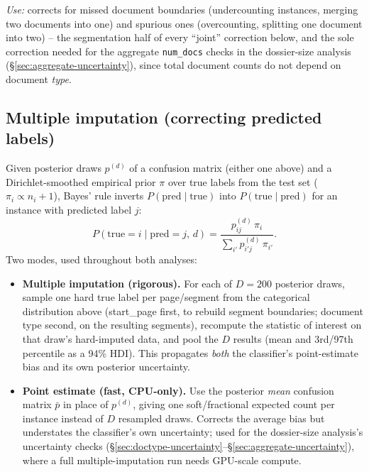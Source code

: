 \textit{Use:} corrects for missed document boundaries (undercounting
instances, merging two documents into one) and spurious ones (overcounting,
splitting one document into two) -- the segmentation half of every ``joint''
correction below, and the sole correction needed for the aggregate
\texttt{num\_docs} checks in the dossier-size analysis
(\S\ref{sec:aggregate-uncertainty}), since total document counts do not
depend on document \emph{type}.

\subsection{Multiple imputation (correcting predicted labels)}
\label{sec:mi}

Given posterior draws $p^{(d)}$ of a confusion matrix (either one above) and
a Dirichlet-smoothed empirical prior $\pi$ over true labels from the test
set ($\pi_i \propto n_i + 1$), Bayes' rule inverts $P(\text{pred}\mid\text{true})$
into $P(\text{true}\mid\text{pred})$ for an instance with predicted label $j$:
\begin{equation}
  P(\text{true}=i \mid \text{pred}=j,\, d) =
    \frac{p^{(d)}_{ij}\, \pi_i}{\sum_{i'} p^{(d)}_{i'j}\, \pi_{i'}}.
\end{equation}
Two modes, used throughout both analyses:
\begin{itemize}
  \item \textbf{Multiple imputation (rigorous).} For each of $D=200$
    posterior draws, sample one hard true label per page/segment from the
    categorical distribution above (start\_page first, to rebuild segment
    boundaries; document type second, on the resulting segments), recompute
    the statistic of interest on that draw's hard-imputed data, and pool the
    $D$ results (mean and 3rd/97th percentile as a 94\% HDI). This
    propagates \emph{both} the classifier's point-estimate bias and its own
    posterior uncertainty.
  \item \textbf{Point estimate (fast, CPU-only).} Use the posterior
    \emph{mean} confusion matrix $\bar p$ in place of $p^{(d)}$, giving one
    soft/fractional expected count per instance instead of $D$ resampled
    draws. Corrects the average bias but understates the classifier's own
    uncertainty; used for the dossier-size analysis's uncertainty checks
    (\S\ref{sec:doctype-uncertainty}--\S\ref{sec:aggregate-uncertainty}),
    where a full multiple-imputation run needs GPU-scale compute.
\end{itemize}

